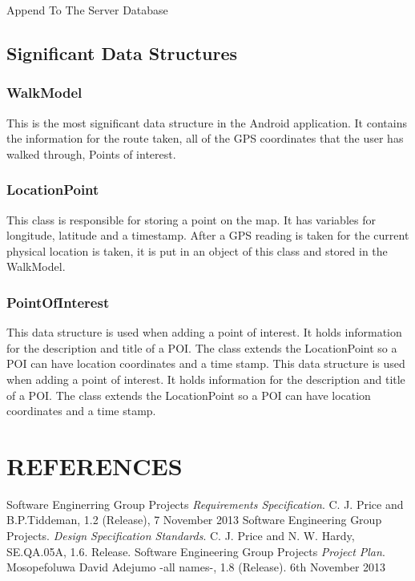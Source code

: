 \documentclass[12pt]{article}
\makeatletter
\renewcommand{\paragraph}{
  \@startsection{paragraph}{4}
  {\z@}{3.25ex \@plus -10em \@minus 1em}{0.1em}
  {\normalfont\normalsize\bfseries}
}
\makeatother
\begin{document}
\paragraph{Append To The Server Database}

\subsection{Significant Data Structures}
\subsubsection{WalkModel}
This is the most significant data structure in the Android application. It contains the information for the route taken,
all of the GPS coordinates that the user has walked through, Points of interest.
\subsubsection{LocationPoint}
This class is responsible for storing a point on the map. It has variables for longitude, latitude and a timestamp.
After a GPS reading is taken for the current physical location is taken, it is put in an object
of this class and stored in the WalkModel.
\subsubsection{PointOfInterest}
This data structure is used when adding a point of interest. It holds information for the description and title of a POI.
The class extends the LocationPoint so a POI can have location coordinates and a time
stamp.
This data structure is used when adding a point of interest. It holds information for the description and title of a POI.
The class extends the LocationPoint so a POI can have location coordinates and a time
stamp.
\newpage 
\section{REFERENCES}
\begin{thebibliography}{0}
  Software Enginerring Group Projects
  \emph{Requirements Specification}.
   C. J. Price and B.P.Tiddeman, 
   1.2 (Release), 
   7 November 2013
Software Engineering Group Projects. 
\emph{Design Specification Standards}.
	C. J. Price and N. W. Hardy, 
	SE.QA.05A,
	1.6. Release.
Software Engineering Group Projects
\emph{ Project Plan}.
Mosopefoluwa David Adejumo -all names-, 1.8
(Release). 6th November 2013
\end{thebibliography}
\newpage
\end{document}
